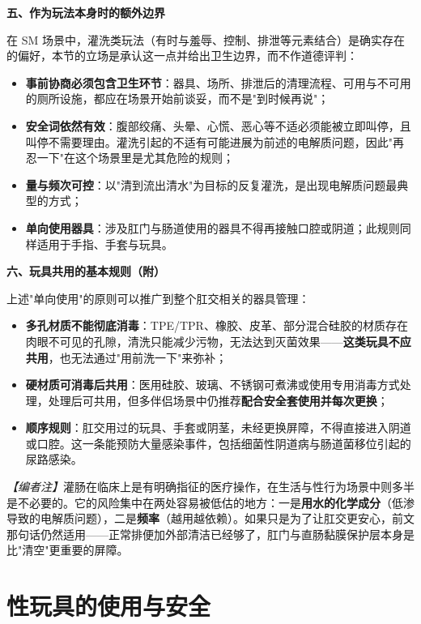 \documentclass[12pt,UTF8]{ctexbook}
\begin{document}
\textbf{五、作为玩法本身时的额外边界}

在 SM 场景中，灌洗类玩法（有时与羞辱、控制、排泄等元素结合）是确实存在的偏好，本节的立场是承认这一点并给出卫生边界，而不作道德评判：

\begin{itemize}
	\item \textbf{事前协商必须包含卫生环节}：器具、场所、排泄后的清理流程、可用与不可用的厕所设施，都应在场景开始前谈妥，而不是"到时候再说"；
	\item \textbf{安全词依然有效}：腹部绞痛、头晕、心慌、恶心等不适必须能被立即叫停，且叫停不需要理由。灌洗引起的不适有可能进展为前述的电解质问题，因此"再忍一下"在这个场景里是尤其危险的规则；
	\item \textbf{量与频次可控}：以"清到流出清水"为目标的反复灌洗，是出现电解质问题最典型的方式；
	\item \textbf{单向使用器具}：涉及肛门与肠道使用的器具不得再接触口腔或阴道；此规则同样适用于手指、手套与玩具。
\end{itemize}

\textbf{六、玩具共用的基本规则（附）}

上述"单向使用"的原则可以推广到整个肛交相关的器具管理：

\begin{itemize}
	\item \textbf{多孔材质不能彻底消毒}：TPE/TPR、橡胶、皮革、部分混合硅胶的材质存在肉眼不可见的孔隙，清洗只能减少污物，无法达到灭菌效果——\textbf{这类玩具不应共用}，也无法通过"用前洗一下"来弥补；
	\item \textbf{硬材质可消毒后共用}：医用硅胶、玻璃、不锈钢可煮沸或使用专用消毒方式处理，处理后可共用，但多伴侣场景中仍推荐\textbf{配合安全套使用并每次更换}；
	\item \textbf{顺序规则}：肛交用过的玩具、手套或阴茎，未经更换屏障，不得直接进入阴道或口腔。这一条能预防大量感染事件，包括细菌性阴道病与肠道菌移位引起的尿路感染。
\end{itemize}

\textit{【编者注】}灌肠在临床上是有明确指征的医疗操作，在生活与性行为场景中则多半是不必要的。它的风险集中在两处容易被低估的地方：一是\textbf{用水的化学成分}（低渗导致的电解质问题），二是\textbf{频率}（越用越依赖）。如果只是为了让肛交更安心，前文那句话仍然适用——正常排便加外部清洁已经够了，肛门与直肠黏膜保护层本身是比"清空"更重要的屏障。

\chapter{性玩具的使用与安全}
\end{document}
